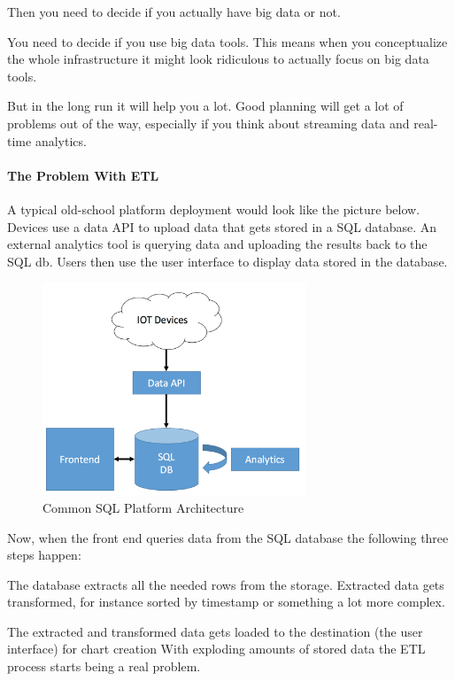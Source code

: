 \documentclass[12pt]{scrartcl} %
\begin{document}
Then you need to decide if you actually have big data or not.

You need to decide if you use big data tools. This means when you conceptualize the whole infrastructure it might look ridiculous to actually focus on big data tools.

But in the long run it will help you a lot. Good planning will get a lot of problems out of the way, especially if you think about streaming data and real-time analytics.

\paragraph{The Problem With ETL}
A typical old-school platform deployment would look like the picture below. Devices use a data API to upload data that gets stored in a SQL database. An external analytics tool is querying data and uploading the results back to the SQL db. Users then use the user interface to display data stored in the database.

\begin{figure}[htbp]
  \centering
     \includegraphics[width=0.7\textwidth]{images/Common-SQL-Architecture}
  \caption{Common SQL Platform Architecture}
  \label{fig:Bild1}
\end{figure}

Now, when the front end queries data from the SQL database the following three steps happen:

The database extracts all the needed rows from the storage. Extracted data gets transformed, for instance sorted by timestamp or something a lot more complex.

The extracted and transformed data gets loaded to the destination (the user interface) for chart creation
With exploding amounts of stored data the ETL process starts being a real problem.
\end{document}
